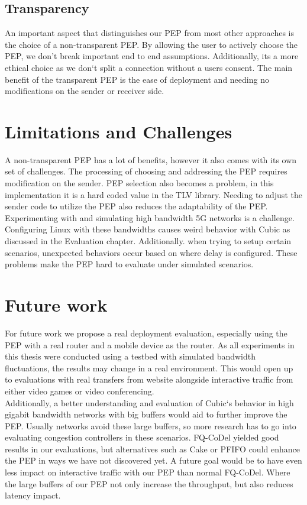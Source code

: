 \documentclass[a4paper,english, 11pt]{report}
\begin{document}
\subsection{Transparency}
An important aspect that distinguishes our PEP from most other approaches is the choice of a non-transparent PEP. By allowing the user to actively choose the PEP, we don't break important end to end assumptions. Additionally, its a more ethical choice as we don`t split a connection without a users consent. The main benefit of the transparent PEP is the ease of deployment and needing no modifications on the sender or receiver side.\\

\section{Limitations and Challenges}

A non-transparent PEP has a lot of benefits, however it also comes with its own set of challenges. The processing of choosing and addressing the PEP requires modification on the sender. PEP selection also becomes a problem, in this implementation it is a hard coded value in the TLV library. Needing to adjust the sender code to utilize the PEP also reduces the adaptability of the PEP.\\

Experimenting with and simulating high bandwidth 5G networks is a challenge. Configuring Linux with these bandwidths causes weird behavior with Cubic as discussed in the Evaluation chapter. Additionally. when trying to setup certain scenarios, unexpected behaviors occur based on where delay is configured. These problems make the PEP hard to evaluate under simulated scenarios.

\section{Future work}
For future work we propose a real deployment evaluation, especially using the PEP with a real router and a mobile device as the router. As all experiments in this thesis were conducted using a testbed with simulated bandwidth fluctuations, the results may change in a real environment. This would open up to evaluations with real transfers from website alongside interactive traffic from either video games or video conferencing.\\

Additionally, a better understanding and evaluation of Cubic`s behavior in high gigabit bandwidth networks with big buffers would aid to further improve the PEP. Usually networks avoid these large buffers, so more research has to go into evaluating congestion controllers in these scenarios. FQ-CoDel yielded good results in our evaluations, but alternatives such as Cake or PFIFO could enhance the PEP in ways we have not discovered yet. A future goal would be to have even less impact on interactive traffic with our PEP than normal FQ-CoDel. Where the large buffers of our PEP not only increase the throughput, but also reduces latency impact.\\ 
\end{document}
